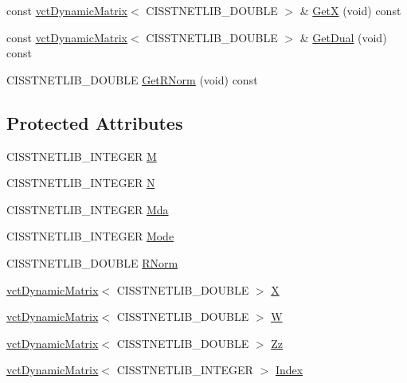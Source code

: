 \begin{DoxyCompactItemize}
\item 
const \hyperlink{classvct_dynamic_matrix}{vct\+Dynamic\+Matrix}$<$ C\+I\+S\+S\+T\+N\+E\+T\+L\+I\+B\+\_\+\+D\+O\+U\+B\+L\+E $>$ \& \hyperlink{classnmr_n_n_l_s_solver_abb01b6e1c320189b9b17ca6c88078879}{Get\+X} (void) const 
\item 
const \hyperlink{classvct_dynamic_matrix}{vct\+Dynamic\+Matrix}$<$ C\+I\+S\+S\+T\+N\+E\+T\+L\+I\+B\+\_\+\+D\+O\+U\+B\+L\+E $>$ \& \hyperlink{classnmr_n_n_l_s_solver_a74640511b0a73435a1b154afcf4fae35}{Get\+Dual} (void) const 
\item 
C\+I\+S\+S\+T\+N\+E\+T\+L\+I\+B\+\_\+\+D\+O\+U\+B\+L\+E \hyperlink{classnmr_n_n_l_s_solver_aab90d2c601668a1ce46c17761b3135a0}{Get\+R\+Norm} (void) const 
\end{DoxyCompactItemize}
\subsection*{Protected Attributes}
\begin{DoxyCompactItemize}
\item 
C\+I\+S\+S\+T\+N\+E\+T\+L\+I\+B\+\_\+\+I\+N\+T\+E\+G\+E\+R \hyperlink{classnmr_n_n_l_s_solver_a162e5dd1f43365b957bb2ba090cb0195}{M}
\item 
C\+I\+S\+S\+T\+N\+E\+T\+L\+I\+B\+\_\+\+I\+N\+T\+E\+G\+E\+R \hyperlink{classnmr_n_n_l_s_solver_a4a8548f915d678551e3b45a1e0243d24}{N}
\item 
C\+I\+S\+S\+T\+N\+E\+T\+L\+I\+B\+\_\+\+I\+N\+T\+E\+G\+E\+R \hyperlink{classnmr_n_n_l_s_solver_a11885a66db967a587d588df43f31747a}{Mda}
\item 
C\+I\+S\+S\+T\+N\+E\+T\+L\+I\+B\+\_\+\+I\+N\+T\+E\+G\+E\+R \hyperlink{classnmr_n_n_l_s_solver_a7f2d0fc2f14c7a924a05df0c4b58afb3}{Mode}
\item 
C\+I\+S\+S\+T\+N\+E\+T\+L\+I\+B\+\_\+\+D\+O\+U\+B\+L\+E \hyperlink{classnmr_n_n_l_s_solver_a5987a1e7bc38cc749adee70d6dfd1ea2}{R\+Norm}
\item 
\hyperlink{classvct_dynamic_matrix}{vct\+Dynamic\+Matrix}$<$ C\+I\+S\+S\+T\+N\+E\+T\+L\+I\+B\+\_\+\+D\+O\+U\+B\+L\+E $>$ \hyperlink{classnmr_n_n_l_s_solver_af7ff95aeea4da8d86ac0fd4bc9a220b4}{X}
\item 
\hyperlink{classvct_dynamic_matrix}{vct\+Dynamic\+Matrix}$<$ C\+I\+S\+S\+T\+N\+E\+T\+L\+I\+B\+\_\+\+D\+O\+U\+B\+L\+E $>$ \hyperlink{classnmr_n_n_l_s_solver_ac107b32faf4f947d4267ad1ae66a76d2}{W}
\item 
\hyperlink{classvct_dynamic_matrix}{vct\+Dynamic\+Matrix}$<$ C\+I\+S\+S\+T\+N\+E\+T\+L\+I\+B\+\_\+\+D\+O\+U\+B\+L\+E $>$ \hyperlink{classnmr_n_n_l_s_solver_ad4d4544b5db001588a0b9742a0b93abc}{Zz}
\item 
\hyperlink{classvct_dynamic_matrix}{vct\+Dynamic\+Matrix}$<$ C\+I\+S\+S\+T\+N\+E\+T\+L\+I\+B\+\_\+\+I\+N\+T\+E\+G\+E\+R $>$ \hyperlink{classnmr_n_n_l_s_solver_a8a75f7f12aceebd264f973684ce1b683}{Index}
\end{DoxyCompactItemize}



